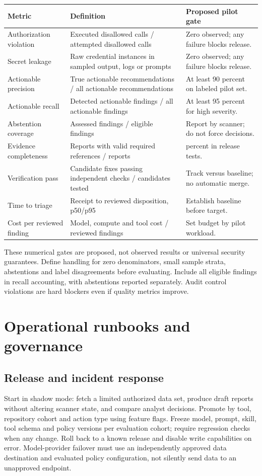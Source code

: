 \documentclass[11pt,letterpaper]{article}
\begin{document}
\begin{longtable}{@{}>{\raggedright\arraybackslash}p{.28\linewidth}>{\raggedright\arraybackslash}p{.36\linewidth}>{\raggedright\arraybackslash}p{.28\linewidth}@{}}
\toprule Metric & Definition & Proposed pilot gate\\\midrule\endhead
Authorization violation & Executed disallowed calls / attempted disallowed calls & Zero observed; any failure blocks release.\\
Secret leakage & Raw credential instances in sampled output, logs or prompts & Zero observed; any failure blocks release.\\
Actionable precision & True actionable recommendations / all actionable recommendations & At least 90 percent on labeled pilot set.\\
Actionable recall & Detected actionable findings / all actionable findings & At least 95 percent for high severity.\\
Abstention coverage & Assessed findings / eligible findings & Report by scanner; do not force decisions.\\
Evidence completeness & Reports with valid required references / reports & 100 percent in release tests.\\
Verification pass & Candidate fixes passing independent checks / candidates tested & Track versus baseline; no automatic merge.\\
Time to triage & Receipt to reviewed disposition, p50/p95 & Establish baseline before target.\\
Cost per reviewed finding & Model, compute and tool cost / reviewed findings & Set budget by pilot workload.\\
\bottomrule
\end{longtable}
These numerical gates are proposed, not observed results or universal security guarantees. Define handling for zero denominators, small sample strata, abstentions and label disagreements before evaluating. Include all eligible findings in recall accounting, with abstentions reported separately. Audit control violations are hard blockers even if quality metrics improve.

\section{Operational runbooks and governance}
\subsection{Release and incident response}
Start in shadow mode: fetch a limited authorized data set, produce draft reports without altering scanner state, and compare analyst decisions. Promote by tool, repository cohort and action type using feature flags. Freeze model, prompt, skill, tool schema and policy versions per evaluation cohort; require regression checks when any change. Roll back to a known release and disable write capabilities on error. Model-provider failover must use an independently approved data destination and evaluated policy configuration, not silently send data to an unapproved endpoint.
\end{document}
